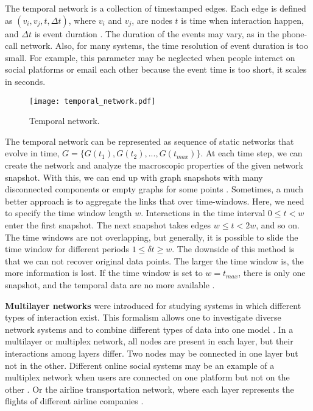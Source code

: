 The temporal network is a collection of timestamped edges. Each edge is defined as $(v_i, v_j, t, \Delta t)$, where $v_i$ and $v_j$, are nodes $t$ is time when interaction happen, and $\Delta t$ is event duration \cite{guide_temporal}. The duration of the events may vary, as in the phone-call network. Also, for many systems, the time resolution of event duration is too small. For example, this parameter may be neglected when people interact on social platforms or email each other because the event time is too short, it scales in seconds.

\begin{figure}[h]
	\centering
	\texttt{[image: temporal\_network.pdf]} 
	\caption[Temporal network.]{Temporal network. }
	\label{fig:gt3}
\end{figure}

The temporal network can be represented as sequence of static networks that evolve in time, $G = \{ G(t_1), G(t_2), ..., G(t_{max})\}$. At each time step, we can create the network and analyze the macroscopic properties of the given network snapshot. With this, we can end up with graph snapshots with many disconnected components or empty graphs for some points \cite{holme2015modern}. Sometimes, a much better approach is to aggregate the links that over time-windows. Here, we need to specify the time window length $w$. Interactions in the time interval $0\leq t<w$ enter the first snapshot. The next snapshot takes edges $w \leq t <2w$, and so on. The time windows are not overlapping, but generally, it is possible to slide the time window for different periods $ 1 \leq \delta t \geq w$. The downside of this method is that we can not recover original data points. The larger the time window is, the more information is lost. If the time window is set to $w=t_{max}$, there is only one snapshot, and the temporal data are no more available \cite{krings2012effects, arnold2021moving}. 

\textbf{Multilayer networks} were introduced for studying systems in which different types of interaction exist. This formalism allows one to investigate diverse network systems and to combine different types of data into one model \cite{porter2018multilayer}. In a multilayer or multiplex network, all nodes are present in each layer, but their interactions among layers differ. Two nodes may be connected in one layer but not in the other. Different online social systems may be an example of a multiplex network when users are connected on one platform but not on the other \cite{aleta2019multilayer}. Or the airline transportation network, where each layer represents the flights of different airline companies \cite{kivelamultilayer}.   

